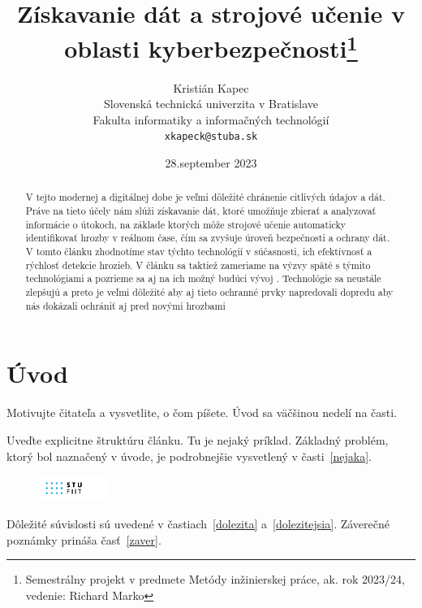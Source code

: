 \documentclass[10pt,twocolumn,twoside,slovak,a4paper]{article}
\title{Získavanie dát a strojové učenie v oblasti kyberbezpečnosti\thanks{Semestrálny projekt v predmete Metódy inžinierskej práce, ak. rok 2023/24, vedenie: Richard Marko}} %
\author{Kristián Kapec\\[2pt]
	{\small Slovenská technická univerzita v Bratislave}\\
	{\small Fakulta informatiky a informačných technológií}\\
	{\small \texttt{xkapeck@stuba.sk}}
	}
\date{\small 28.september 2023} %
\begin{document}
\maketitle

\begin{abstract}
V tejto modernej a digitálnej dobe je veľmi dôležité chránenie citlivých údajov a dát. Práve na tieto účely nám slúži získavanie dát, ktoré umožňuje zbierať a analyzovať informácie o útokoch, na základe ktorých môže strojové učenie automaticky identifikovať hrozby v reálnom čase, čím sa zvyšuje úroveň bezpečnosti a ochrany dát.  V tomto článku zhodnotíme stav týchto technológií v súčasnosti, ich efektívnosť a rýchlosť detekcie hrozieb. V článku sa taktiež zameriame na výzvy späté s týmito technológiami a pozrieme sa aj na ich možný budúci vývoj . Technológie sa neustále zlepšujú a preto je veľmi dôležité aby aj tieto ochranné prvky napredovali dopredu aby nás dokázali ochrániť aj pred novými hrozbami
\end{abstract}



\section{Úvod}

Motivujte čitateľa a vysvetlite, o čom píšete. Úvod sa väčšinou nedelí na časti.

Uveďte explicitne štruktúru článku. Tu je nejaký príklad.
Základný problém, ktorý bol naznačený v úvode, je podrobnejšie vysvetlený v časti~\ref{nejaka}.
\begin{figure}
\includegraphics[width=0.2\textwidth]{STU-FIIT-zfv.png}
 \centering
\end{figure}
Dôležité súvislosti sú uvedené v častiach~\ref{dolezita} a~\ref{dolezitejsia}.
Záverečné poznámky prináša časť~\ref{zaver}.
\end{document}
